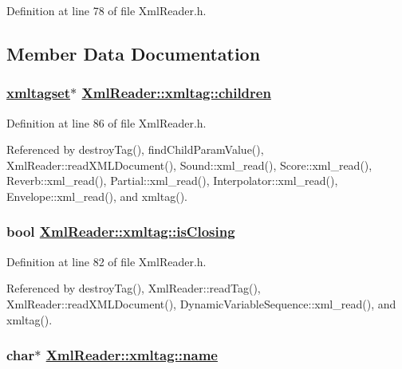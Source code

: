 Definition at line 78 of file Xml\-Reader.h.

\subsection{Member Data Documentation}
\hypertarget{classXmlReader_1_1xmltag_o3}{
\subsubsection[children]{\setlength{\rightskip}{0pt plus 5cm}\hyperlink{classXmlReader_1_1xmltagset}{xmltagset}$\ast$ \hyperlink{classXmlReader_1_1xmltag_o3}{Xml\-Reader::xmltag::children}}}
\label{classXmlReader_1_1xmltag_o3}




Definition at line 86 of file Xml\-Reader.h.

Referenced by destroy\-Tag(), find\-Child\-Param\-Value(), Xml\-Reader::read\-XMLDocument(), Sound::xml\_\-read(), Score::xml\_\-read(), Reverb::xml\_\-read(), Partial::xml\_\-read(), Interpolator::xml\_\-read(), Envelope::xml\_\-read(), and xmltag().\hypertarget{classXmlReader_1_1xmltag_o2}{
\subsubsection[isClosing]{\setlength{\rightskip}{0pt plus 5cm}bool \hyperlink{classXmlReader_1_1xmltag_o2}{Xml\-Reader::xmltag::is\-Closing}}}
\label{classXmlReader_1_1xmltag_o2}




Definition at line 82 of file Xml\-Reader.h.

Referenced by destroy\-Tag(), Xml\-Reader::read\-Tag(), Xml\-Reader::read\-XMLDocument(), Dynamic\-Variable\-Sequence::xml\_\-read(), and xmltag().\hypertarget{classXmlReader_1_1xmltag_o0}{
\subsubsection[name]{\setlength{\rightskip}{0pt plus 5cm}char$\ast$ \hyperlink{classXmlReader_1_1xmltag_o0}{Xml\-Reader::xmltag::name}}}
\label{classXmlReader_1_1xmltag_o0}




